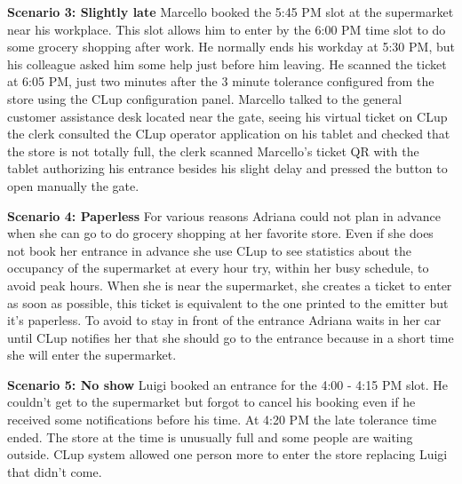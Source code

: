 \medskip

\textbf{Scenario 3: Slightly late}
Marcello booked the 5:45 PM slot at the supermarket near his workplace. This slot allows him to enter by the 6:00 PM time slot to do some grocery shopping after work. He normally ends his workday at 5:30 PM, but his colleague asked him some help just before him leaving. He scanned the ticket at 6:05 PM, just two minutes after the 3 minute tolerance configured from the store using the CLup configuration panel. Marcello talked to the general customer assistance desk located near the gate, seeing his virtual ticket on CLup the clerk consulted the CLup operator application on his tablet and checked that the store is not totally full, the clerk scanned Marcello's ticket QR with the tablet authorizing his entrance besides his slight delay and pressed the button to open manually the gate.

\medskip

\textbf{Scenario 4: Paperless}
For various reasons Adriana could not plan in advance when she can go to do grocery shopping at her favorite store. Even if she does not book her entrance in advance she use CLup to see statistics about the occupancy of the supermarket at every hour try, within her busy schedule, to avoid peak hours. When she is near the supermarket, she creates a ticket to enter as soon as possible, this ticket is equivalent to the one printed to the emitter but it's paperless. To avoid to stay in front of the entrance Adriana waits in her car until CLup notifies her that she should go to the entrance because in a short time she will enter the supermarket.

\medskip

\textbf{Scenario 5: No show}
Luigi booked an entrance for the 4:00 - 4:15 PM slot. He couldn't get to the supermarket but forgot to cancel his booking even if he received some notifications before his time. At 4:20 PM the late tolerance time ended. The store at the time is unusually full and some people are waiting outside. CLup system allowed one person more to enter the store replacing Luigi that didn't come.

\medskip


